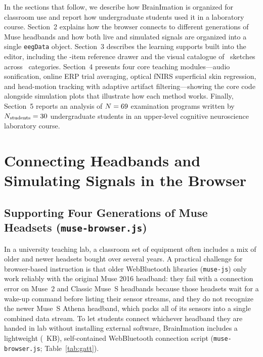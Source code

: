 \documentclass[11pt]{article}
\begin{document}
In the sections that follow, we describe how BrainImation is organized for classroom use and report how undergraduate students used it in a laboratory course. Section~2 explains how the browser connects to different generations of Muse headbands and how both live and simulated signals are organized into a single \texttt{eegData} object. Section~3 describes the learning supports built into the editor, including the \NRefAPIs-item reference drawer and the visual catalogue of \NCatalogueSketches\ sketches across \NCatalogueCategories\ categories. Section~4 presents four core teaching modules---audio sonification, online ERP trial averaging, optical fNIRS superficial skin regression, and head-motion tracking with adaptive artifact filtering---showing the core code alongside simulation plots that illustrate how each method works. Finally, Section~5 reports an analysis of $N = 69$ examination programs written by $N_{\text{students}} = 30$ undergraduate students in an upper-level cognitive neuroscience laboratory course.

\section{Connecting Headbands and Simulating Signals in the Browser}

\subsection{Supporting Four Generations of Muse Headsets (\texttt{muse-browser.js})}
In a university teaching lab, a classroom set of equipment often includes a mix of older and newer headsets bought over several years. A practical challenge for browser-based instruction is that older WebBluetooth libraries (\texttt{muse-js}) only work reliably with the original Muse 2016 headband: they fail with a connection error on Muse~2 and Classic Muse~S headbands because those headsets wait for a wake-up command before listing their sensor streams, and they do not recognize the newer Muse~S Athena headband, which packs all of its sensors into a single combined data stream. To let students connect whichever headband they are handed in lab without installing external software, BrainImation includes a lightweight (\MuseBrowserKB~KB), self-contained WebBluetooth connection script (\texttt{muse-browser.js}; Table~\ref{tab:gatt}).
\end{document}
